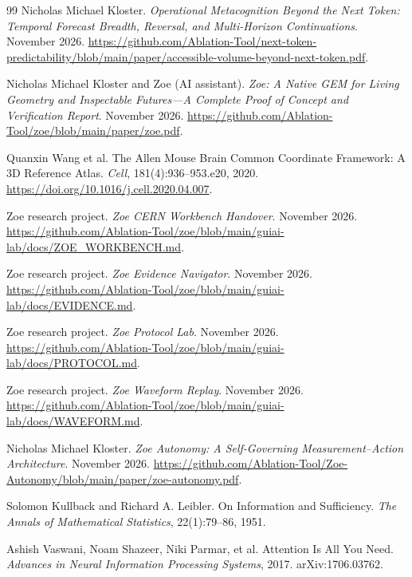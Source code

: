 \begin{thebibliography}{99}
Nicholas Michael Kloster.
\newblock \emph{Operational Metacognition Beyond the Next Token: Temporal Forecast Breadth, Reversal, and Multi-Horizon Continuations}.
\newblock November 2026.
\newblock \url{https://github.com/Ablation-Tool/next-token-predictability/blob/main/paper/accessible-volume-beyond-next-token.pdf}.

Nicholas Michael Kloster and Zoe (AI assistant).
\newblock \emph{Zoe: A Native GEM for Living Geometry and Inspectable Futures---A Complete Proof of Concept and Verification Report}.
\newblock November 2026.
\newblock \url{https://github.com/Ablation-Tool/zoe/blob/main/paper/zoe.pdf}.

Quanxin Wang et al.
\newblock The Allen Mouse Brain Common Coordinate Framework: A 3D Reference Atlas.
\newblock \emph{Cell}, 181(4):936--953.e20, 2020.
\newblock \url{https://doi.org/10.1016/j.cell.2020.04.007}.

Zoe research project.
\newblock \emph{Zoe CERN Workbench Handover}.
\newblock November 2026.
\newblock \url{https://github.com/Ablation-Tool/zoe/blob/main/guiai-lab/docs/ZOE_WORKBENCH.md}.

Zoe research project.
\newblock \emph{Zoe Evidence Navigator}.
\newblock November 2026.
\newblock \url{https://github.com/Ablation-Tool/zoe/blob/main/guiai-lab/docs/EVIDENCE.md}.

Zoe research project.
\newblock \emph{Zoe Protocol Lab}.
\newblock November 2026.
\newblock \url{https://github.com/Ablation-Tool/zoe/blob/main/guiai-lab/docs/PROTOCOL.md}.

Zoe research project.
\newblock \emph{Zoe Waveform Replay}.
\newblock November 2026.
\newblock \url{https://github.com/Ablation-Tool/zoe/blob/main/guiai-lab/docs/WAVEFORM.md}.

Nicholas Michael Kloster.
\newblock \emph{Zoe Autonomy: A Self-Governing Measurement--Action Architecture}.
\newblock November 2026.
\newblock \url{https://github.com/Ablation-Tool/Zoe-Autonomy/blob/main/paper/zoe-autonomy.pdf}.

Solomon Kullback and Richard A. Leibler.
\newblock On Information and Sufficiency.
\newblock \emph{The Annals of Mathematical Statistics}, 22(1):79--86, 1951.

Ashish Vaswani, Noam Shazeer, Niki Parmar, et al.
\newblock Attention Is All You Need.
\newblock \emph{Advances in Neural Information Processing Systems}, 2017.
\newblock arXiv:1706.03762.


\end{thebibliography}
